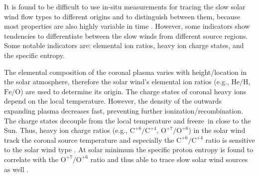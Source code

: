 It is found to be difficult to use in-situ measurements for tracing the slow solar wind flow types to different origins and to distinguish between them, because most properties are also highly variable in time \citep{Kilpua2016}. However, some indicators show tendencies to differentiate between the slow winds from different source regions. Some notable indicators are: elemental ion ratios, heavy ion charge states, and the specific entropy.

The elemental composition of the coronal plasma varies with height/location in the solar atmosphere, therefore the solar wind's elemental ion ratios (e.g., $\text{He}/\text{H}$, $\text{Fe}/\text{O}$) are used to determine its origin.
The charge states of coronal heavy ions depend on the local temperature. However, the density of the outwards expanding plasma decreases fast, preventing further ionization/recombination. The charge states decouple from the local temperature and freeze~in close to the Sun. Thus, heavy ion charge ratios (e.g., $\text{C}^{+6}\!/\text{C}^{+4}$, $\text{O}^{+7}\!/\text{O}^{+6}$) in the solar wind track the coronal source temperature and especially the $\text{C}^{+6}\!/\text{C}^{+4}$ ratio is sensitive to the solar wind type \citep{Landi2012}.
At solar minimum the specific proton entropy is found to correlate with the $\text{O}^{+7}\!/\text{O}^{+6}$ ratio and thus able to trace slow solar wind sources as well \citep{Pagel2004}.

